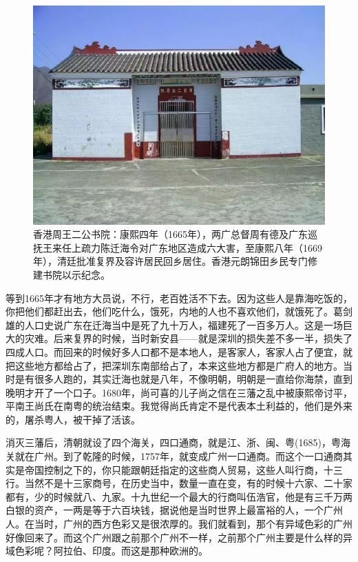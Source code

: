 \begin{figure}
	\centering
	\includegraphics[width=\textwidth]{images/image-64}
	\caption{香港周王二公书院：康熙四年（1665年），两广总督周有德及广东巡抚王来任上疏力陈迁海令对广东地区造成六大害，至康熙八年（1669年），清廷批准复界及容许居民回乡居住。香港元朗锦田乡民专门修建书院以示纪念。}
\end{figure}

等到1665年才有地方大员说，不行，老百姓活不下去。因为这些人是靠海吃饭的，你把他们都赶出去，他们吃什么，饿死，内地的人也不喜欢他们，就饿死了。葛剑雄的人口史说广东在迁海当中是死了九十万人，福建死了一百多万人。这是一场巨大的灾难。后来复界的时候，当时新安县——就是深圳的损失差不多一半，损失了四成人口。而回来的时候好多人口都不是本地人，是客家人，客家人占了便宜，就把这些地方都给占了，把深圳东南部给占了，本来这些地方都是广府人的地方。当时是有很多人跑的，其实迁海也就是八年，不像明朝，明朝是一直给你海禁，直到晚明才开了一个口子。1680年，尚可喜的儿子尚之信在三藩之乱中被康熙帝讨平，平南王尚氏在南粤的统治结束。我觉得尚氏肯定不是代表本土利益的，他们是外来的，屠杀粤人，被干掉了活该。

消灭三藩后，清朝就设了四个海关，四口通商，就是江、浙、闽、粤(1685)，粤海关就在广州。到了乾隆的时候，1757年，就变成广州一口通商。而这个一口通商其实是帝国控制之下的，你只能跟朝廷指定的这些商人贸易，这些人叫行商，十三行。当然不是十三家商号，在历史当中，数量一直在变，有的时候十六家、二十家都有，少的时候就八、九家。十九世纪一个最大的行商叫伍浩官，他是有三千万两白银的资产，一两是等于六百块钱，据说他是当时世界上最富裕的人，一个广州人。在当时，广州的西方色彩又是很浓厚的。我们就看到，那个有异域色彩的广州好像回来了。而这个广州跟之前那个广州不一样，之前那个广州主要是什么样的异域色彩呢？阿拉伯、印度。而这是那种欧洲的。

